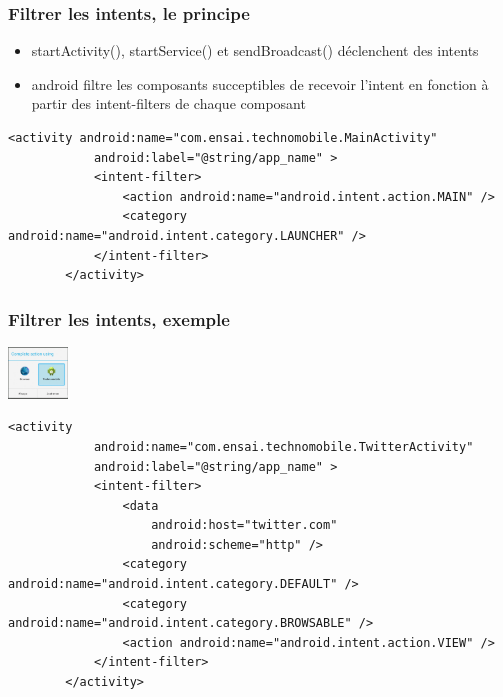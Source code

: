 \documentclass{beamer}
\begin{document}
\begin{frame}[fragile]
\frametitle{Filtrer les intents, le principe}
\begin{itemize}
    \item startActivity(), startService() et sendBroadcast() déclenchent des
    intents
	\item android filtre les composants succeptibles de recevoir l'intent en
	fonction à partir des intent-filters de chaque composant
\end{itemize}

\begin{lstlisting}
<activity android:name="com.ensai.technomobile.MainActivity"
            android:label="@string/app_name" >
            <intent-filter>
                <action android:name="android.intent.action.MAIN" />
                <category android:name="android.intent.category.LAUNCHER" />
            </intent-filter>
        </activity>
\end{lstlisting}
\end{frame}
\begin{frame}[fragile]
\frametitle{Filtrer les intents, exemple}
\includegraphics[width=45pt]{intentchooser.jpg}
\begin{lstlisting}
<activity
            android:name="com.ensai.technomobile.TwitterActivity"
            android:label="@string/app_name" >
            <intent-filter>
                <data
                    android:host="twitter.com"
                    android:scheme="http" />
                <category android:name="android.intent.category.DEFAULT" />
                <category android:name="android.intent.category.BROWSABLE" />
                <action android:name="android.intent.action.VIEW" />
            </intent-filter>
        </activity>
\end{lstlisting}
\end{frame}
\end{document}
